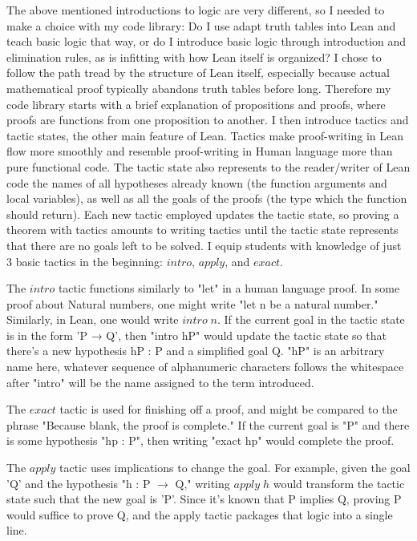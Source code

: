 The above mentioned introductions to logic are very different, so I needed
to make a choice with my code library: Do I use adapt truth tables into
Lean and teach basic logic that way, or do I introduce basic logic through
introduction and elimination rules, as is infitting with how Lean itself 
is organized? I chose to follow the path tread by the structure of Lean itself,
especially because actual mathematical proof typically abandons truth tables
before long. Therefore my code library starts with a brief explanation of
propositions and proofs, where proofs are functions from one proposition to
another. I then introduce tactics and tactic states, the other main feature
of Lean. Tactics make proof-writing in Lean flow more smoothly and resemble 
proof-writing in Human language more than pure functional code. The tactic
state also represents to the reader/writer of Lean code the names of all
hypotheses already known (the function arguments and local variables), as 
well as all the goals of the proofs (the type which the function should return).
Each new tactic employed updates the tactic state, so proving a theorem with
tactics amounts to writing tactics until the tactic state represents that there
are no goals left to be solved. I equip students with knowledge of just 3 basic
tactics in the beginning: $intro$, $apply$, and $exact$.

The $intro$ tactic functions similarly to "let" in a human language proof. 
In some proof about Natural numbers, one might write "let n be a natural number."
Similarly, in Lean, one would write $intro\;n$.
If the current goal in the tactic state is in the form 'P → Q', then
"intro hP" would update the tactic state so that there's a new hypothesis
hP : P and a simplified goal Q. "hP" is an arbitrary name here, whatever
sequence of alphanumeric characters follows the whitespace after "intro" will
be the name assigned to the term introduced. 

The $exact$ tactic is used for finishing off a proof, and might be compared
to the phrase "Because blank, the proof is complete." If the current goal is
"P" and there is some hypothesis "hp : P", then writing "exact hp" would 
complete the proof.

The $apply$ tactic uses implications to change the goal. For example, 
given the goal 'Q' and the hypothesis "h : P $\to$ Q," writing
$apply\;h$ would transform the tactic state such that the new goal
is 'P'. Since it's known that P implies Q, proving P would suffice to 
prove Q, and the apply tactic packages that logic into a single line.


